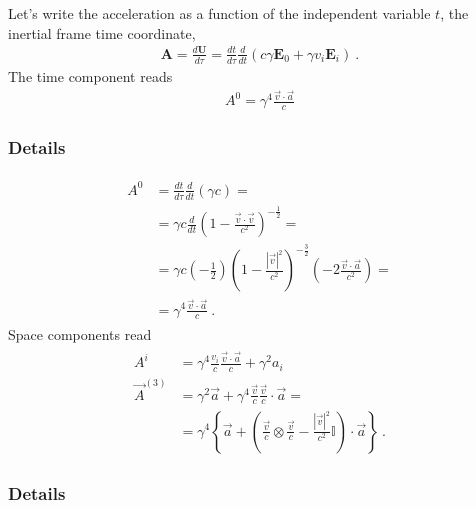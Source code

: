 \documentclass[letterpaper,10pt,english]{jupyterBook}
\begin{document}
\sphinxAtStartPar
Let’s write the acceleration as a function of the independent variable \(t\), the inertial frame time coordinate,
\begin{equation*}
\begin{split}\mathbf{A} = \frac{d \mathbf{U}}{d \tau} = \frac{d t}{d \tau} \frac{d}{dt} \left( c \gamma \mathbf{E}_0 + \gamma v_i \mathbf{E}_i \right) \ .\end{split}
\end{equation*}
\sphinxAtStartPar
The time component reads
\begin{equation*}
\begin{split} A^0 = \gamma^4 \frac{\vec{v} \cdot \vec{a}}{c} \end{split}
\end{equation*}\subsubsection*{Details}
\begin{equation*}
\begin{split}\begin{aligned}
  A^0 
  & = \frac{d t}{d \tau} \frac{d}{dt} \left( \gamma c \right) = \\
  & = \gamma c \frac{d}{dt} \left( 1 - \frac{\vec{v} \cdot \vec{v}}{c^2} \right)^{-\frac{1}{2}} = \\
  & = \gamma c \left( - \frac{1}{2} \right) \left( 1 - \frac{| \vec{v} |^2}{c^2} \right)^{-\frac{3}{2}} \left( - 2 \frac{\vec{v} \cdot \vec{a}}{c^2} \right) = \\
  & = \gamma^4 \frac{\vec{v} \cdot \vec{a}}{c} \ .
\end{aligned}\end{split}
\end{equation*}
\sphinxAtStartPar
Space components read
\begin{equation*}
\begin{split}\begin{aligned}
  A^i & = \gamma^4  \frac{v_i}{c}\frac{\vec{v} \cdot \vec{a}}{c} + \gamma^2 a_i \\
  \vec{A}^{(3)}
  & = \gamma^2 \vec{a} + \gamma^4 \frac{\vec{v}}{c} \frac{\vec{v}}{c} \cdot \vec{a} = \\
  & = \gamma^4 \left\{ \vec{a} + \left( \frac{\vec{v}}{c} \otimes \frac{\vec{v}}{c} - \frac{| \vec{v} |^2}{c^2} \mathbb{I} \right) \cdot \vec{a} \right\}  \ .
\end{aligned}\end{split}
\end{equation*}\subsubsection*{Details}
\end{document}
